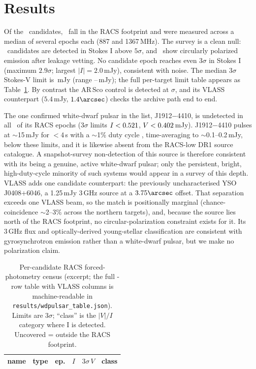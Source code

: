 \documentclass[twocolumn]{aastex631}
\newcommand{\code}[1]{\texttt{#1}}
\begin{document}
\section{Results}
\label{sec:results}
Of the \wdNCand\ candidates, \wdRealNCandCovered\ fall in the RACS footprint and were measured
across a median of several epochs each (887 and 1367\,MHz). The survey is a clean null:
\wdRealNCandIDet\ candidates are detected in Stokes I above $5\sigma$, and \wdRealNCandVDet\
show circularly polarized emission after leakage vetting. No candidate epoch reaches even
$3\sigma$ in Stokes I (maximum $2.9\sigma$; largest $|I| = 2.0$\,mJy), consistent with noise.
The median $3\sigma$ Stokes-V limit is \wdRealMedianVLimit\,mJy (range
\wdRealVLimMin--\wdRealVLimMax\,mJy); the full per-target limit table appears as
Table~\ref{tab:limits}. By contrast the AR\,Sco control is detected at \wdRealControlSnr$\sigma$,
and its VLASS counterpart ($5.4$\,mJy, $1.4\arcsec$) checks the archive path end to end.

The one confirmed white-dwarf pulsar in the list, J1912$-$4410, is undetected in all
\wdRealJEpochs\ of its RACS epochs ($3\sigma$ limits $I<0.521$, $V<0.402$\,mJy).
J1912$-$4410 pulses at $\sim$15\,mJy for $<$4\,s with a $\sim$1\% duty cycle
\citep{pelisoli2023}, time-averaging to $\sim$0.1--0.2\,mJy, below these limits, and it is
likewise absent from the RACS-low DR1 source catalogue. A snapshot-survey non-detection of this
source is therefore consistent with its being a genuine, active white-dwarf pulsar; only the
persistent, bright, high-duty-cycle minority of such systems would appear in a survey of this
depth. VLASS adds one candidate counterpart: the previously uncharacterised YSO J0408$+$6046, a
1.25\,mJy 3\,GHz source at a $3.75\arcsec$ offset. That separation exceeds one VLASS beam, so
the match is positionally marginal (chance-coincidence $\sim$2--3\% across the northern
targets), and, because the source lies north of the RACS footprint, no circular-polarization
constraint exists for it. Its 3\,GHz flux and optically-derived young-stellar classification are
consistent with gyrosynchrotron emission rather than a white-dwarf pulsar, but we make no
polarization claim.

\begin{table}
\centering
\caption{Per-candidate RACS forced-photometry census (excerpt; the full
\wdNCand-row table with VLASS columns is machine-readable in
\code{results/wdpulsar\_table.json}). Limits are $3\sigma$; ``class'' is the $|V|/I$ category
where I is detected. Uncovered = outside the RACS footprint.}
\label{tab:limits}
\footnotesize
\begin{tabular}{llrrrl}
\hline
name & type & ep. & $I$ & $3\sigma\,V$ & class \\
\hline

\end{tabular}
\end{table}
\end{document}
